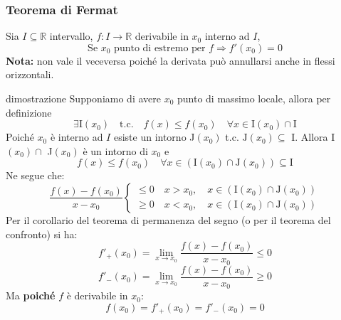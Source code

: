 \documentclass[x11names]{article}
\begin{document}
	\begin{center}
		\colorbox{myred}{\begin{minipage}{5.75in}
				\begin{redes}{}
					\subsubsection{Teorema di Fermat}
					Sia $I \subseteq \mathbb{R}$ intervallo, $f: I \to \mathbb{R}$ derivabile in $x_0$ interno ad $I$,
					\[
					\text{Se } x_0 \text{ punto di estremo per } f \Longrightarrow f'(x_0) = 0 
					\]
					\textbf{Nota:} non vale il veceversa poiché la derivata può annullarsi anche in flessi orizzontali.
				\end{redes}
		\end{minipage}}        
	\end{center}
	
	\begin{es}{dimostrazione}
		Supponiamo di avere $x_0$ punto di massimo locale, allora per definizione
		\[
		\exists \text{I}(x_0) \quad \text{t.c.} \quad f(x) \leq f(x_0) \quad \forall x \in \text{I}(x_0) \cap \text{I}
		\]
		Poiché $x_0$ è interno ad $I$ esiste un intorno J$(x_0)$ t.c. $\text{J}(x_0) \subseteq$ I. Allora I$(x_0) \cap$ J$(x_0)$ è un intorno di $x_0$ e 
		\[
		f(x) \leq f(x_0) \quad \forall x \in \left( \text{I}(x_0) \cap \text{J}(x_0)\right) \subseteq \text{I}
		\]
		Ne segue che:
		\[
		\frac{f(x) - f(x_0)}{x - x_0} \begin{cases}
			\leq 0 \quad x> x_0, \quad x \in \left( \text{I}(x_0) \cap \text{J}(x_0) \right)  \\
			\geq 0 \quad x< x_0, \quad x \in \left( \text{I}(x_0) \cap \text{J}(x_0) \right)
		\end{cases}
		\]
		Per il corollario del teorema di permanenza del segno (o per il teorema del confronto) si ha:
		\[
		f'_+ (x_0) = \lim_{x\to x_0}\frac{f(x) - f(x_0)}{x - x_0} \leq 0
		\]
		\[
		f'_- (x_0) = \lim_{x\to x_0}\frac{f(x) - f(x_0)}{x - x_0} \geq 0
		\]
		Ma \textbf{poiché} $f$ è derivabile in $x_0$:
		\[
		f(x_0) = f'_+(x_0) = f'_-(x_0) = 0
		\]
	\end{es}
	
\end{document}
